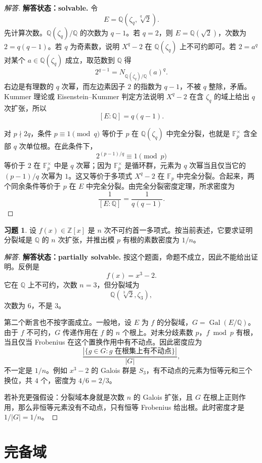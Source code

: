 \documentclass[11pt,a4paper,openany]{ctexbook}
\numberwithin{equation}{chapter}
\newcommand{\Q}{\mathbb{Q}}
\newcommand{\Z}{\mathbb{Z}}
\newcommand{\F}{\mathbb{F}}
\newcommand{\Gal}{\operatorname{Gal}}
\theoremstyle{plain}
\theoremstyle{definition}
\newtheorem{exercise}[theorem]{习题}
\theoremstyle{remark}
\begin{document}
\begin{proof}[解答]
\textbf{解答状态：solvable.}
令
\[
E=\Q(\zeta_q,\sqrt[q]{2}).
\]
先计算次数。$\Q(\zeta_q)/\Q$ 的次数为 $q-1$。若 $q=2$，则
$E=\Q(\sqrt2)$，次数为 $2=q(q-1)$。若 $q$ 为奇素数，说明
$X^q-2$ 在 $\Q(\zeta_q)$ 上不可约即可。若 $2=a^q$ 对某个
$a\in\Q(\zeta_q)$ 成立，取范数到 $\Q$ 得
\[
2^{q-1}=N_{\Q(\zeta_q)/\Q}(a)^q.
\]
右边是有理数的 $q$ 次幂，而左边素因子 $2$ 的指数为 $q-1$，不被
$q$ 整除，矛盾。Kummer 理论或 Eisenstein--Kummer 判定方法说明
$X^q-2$ 在含 $\zeta_q$ 的域上给出 $q$ 次扩张，所以
\[
[E:\Q]=q(q-1).
\]

对 $p\nmid 2q$，条件 $p\equiv1\pmod q$ 等价于 $p$ 在
\(\Q(\zeta_q)\) 中完全分裂，也就是 $\F_p^\times$ 含全部 $q$ 次单位根。在此条件下，
\[
2^{(p-1)/q}\equiv1\pmod p
\]
等价于 $2$ 在 $\F_p^\times$ 中是 $q$ 次幂；因为 $\F_p^\times$ 是循环群，元素为
$q$ 次幂当且仅当它的 $(p-1)/q$ 次幂为 $1$。这又等价于多项式
$X^q-2$ 在 $\F_p$ 中完全分裂。合起来，两个同余条件等价于 $p$ 在
$E$ 中完全分裂。由完全分裂密度定理，所求密度为
\[
\frac1{[E:\Q]}=\frac1{q(q-1)}.
\]
\end{proof}

\begin{exercise}
设 $f(x)\in\Z[x]$ 是 $n$ 次不可约首一多项式。按当前表述，它要求证明分裂域是 $\Q$ 的 $n$ 次扩张，并推出模 $p$ 有根的素数密度为 $1/n$。
\end{exercise}

\begin{proof}[解答]
\textbf{解答状态：partially solvable.}
按这个题面，命题不成立，因此不能给出证明。反例是
\[
f(x)=x^3-2.
\]
它在 $\Q$ 上不可约，次数 $n=3$，但分裂域为
\[
\Q(\sqrt[3]{2},\zeta_3),
\]
次数为 $6$，不是 $3$。

第二个断言也不按字面成立。一般地，设 $E$ 为 $f$ 的分裂域，$G=\Gal(E/\Q)$。由于 $f$ 不可约，$G$ 传递作用在 $f$ 的 $n$ 个根上。对未分歧素数 $p$，$f\bmod p$ 有根，当且仅当 Frobenius 在这个置换作用中有不动点。因此密度应为
\[
\frac{|\{g\in G:g\text{ 在根集上有不动点}\}|}{|G|},
\]
不一定是 $1/n$。例如 $x^3-2$ 的 Galois 群是 $S_3$，有不动点的元素为恒等元和三个换位，共 $4$ 个，密度为 $4/6=2/3$。

若补充更强假设：分裂域本身就是次数 $n$ 的 Galois 扩张，且 $G$ 在根上正则作用，那么非恒等元素没有不动点，只有恒等 Frobenius 给出根。此时密度才是 $1/|G|=1/n$。
\end{proof}
 \chapter{完备域}
\end{document}
